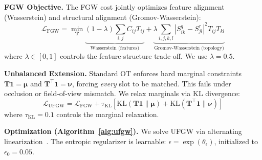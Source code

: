 \documentclass{article}
\newcommand{\cL}{\mathcal{L}}
\begin{document}
\textbf{FGW Objective.}
The FGW cost jointly optimizes feature alignment (Wasserstein) and structural alignment (Gromov-Wasserstein):
\begin{equation}
    \cL_{\text{FGW}} = \min_{\mathbf{T}} \underbrace{(1-\lambda) \sum_{i,j} C_{ij} T_{ij}}_{\text{Wasserstein (features)}} + \underbrace{\lambda \sum_{i,j,k,l} |S^q_{ik} - S^r_{jl}|^2 T_{ij} T_{kl}}_{\text{Gromov-Wasserstein (topology)}}
\end{equation}
where $\lambda \in [0, 1]$ controls the feature-structure trade-off. We use $\lambda = 0.5$.

\textbf{Unbalanced Extension.}
Standard OT enforces hard marginal constraints $\mathbf{T}\mathbf{1} = \boldsymbol{\mu}$ and $\mathbf{T}^\top \mathbf{1} = \boldsymbol{\nu}$, forcing \textit{every} slot to be matched. This fails under occlusion or field-of-view mismatch. We relax marginals via KL divergence:
\begin{equation}
    \cL_{\text{UFGW}} = \cL_{\text{FGW}} + \tau_{\text{KL}} \left[ \text{KL}(\mathbf{T}\mathbf{1} \| \boldsymbol{\mu}) + \text{KL}(\mathbf{T}^\top\mathbf{1} \| \boldsymbol{\nu}) \right]
\end{equation}
where $\tau_{\text{KL}} = 0.1$ controls the marginal relaxation.

\textbf{Optimization (Algorithm~\ref{alg:ufgw}).}
We solve UFGW via alternating linearization~\cite{titouan2019fgw}. The entropic regularizer is learnable: $\epsilon = \exp(\theta_\epsilon)$, initialized to $\epsilon_0 = 0.05$.
\end{document}

